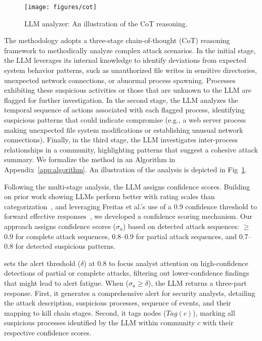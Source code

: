 \begin{figure}[!btp]
\setlength{\abovecaptionskip}{3pt}
\setlength{\belowcaptionskip}{0pt}
\centering
\texttt{[image: figures/cot]}
\caption{LLM analyzer: An illustration of the CoT reasoning.}
\label{fig:cot}
\end{figure}

\noindent The methodology adopts a three-stage chain-of-thought (CoT) reasoning framework to methodically analyze complex attack scenarios.
In the initial stage, the LLM leverages its internal knowledge to identify deviations from expected system behavior patterns, such as unauthorized file writes in sensitive directories, unexpected network connections, or abnormal process spawning. 
Processes exhibiting these suspicious activities or those that are unknown to the LLM are flagged for further investigation. 
In the second stage, the LLM analyzes the temporal sequence of actions associated with each flagged process, identifying suspicious patterns that could indicate compromise (e.g., a web server process making unexpected file system modifications or establishing unusual network connections).
Finally, in the third stage, the LLM investigates inter-process relationships in a community, highlighting patterns that suggest a cohesive attack summary. 
We formalize the method in an Algorithm in Appendix~\ref{app:algorithm}. An illustration of the analysis is depicted in Fig~\ref{fig:cot}. 

\noindent Following the multi-stage analysis, the LLM assigns confidence scores. Building on prior work showing LLMs perform better with rating scales than categorization~\cite{zhuang2024}, and leveraging Freitas et al.'s use of a 0.9 confidence threshold to forward effective responses~\cite{freitas2024}, we developed a confidence scoring mechanism. Our approach assigns confidence scores ($\sigma_a$) based on detected attack sequences: $\geq$0.9 for complete attack sequences, 0.8–0.9 for partial attack sequences, and 0.7–0.8 for detected suspicious patterns.

\method sets the alert threshold ($\delta$) at 0.8 to focus analyst attention on high-confidence detections of partial or complete attacks, filtering out lower-confidence findings that might lead to alert fatigue.
When ($\sigma_a \geq \delta$), the LLM returns a three-part response. 
First, it generates a comprehensive alert for security analysts, detailing the attack description, suspicious processes, sequence of events, and their mapping to kill chain stages. 
Second, it tags nodes ($Tag(c)$), marking all suspicious processes identified by the LLM within community $c$ with their respective confidence scores. 

